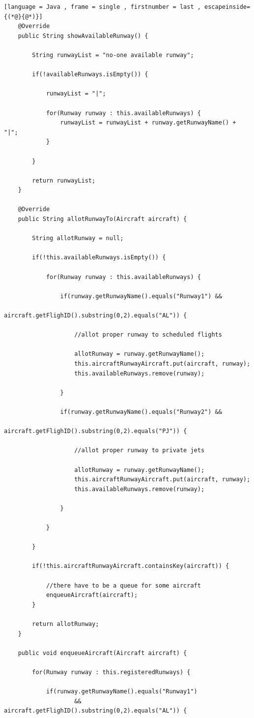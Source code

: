 \documentclass{article}
\begin{document}
\begin{sloppy}
\begin{lstlisting}[language = Java , frame = single , firstnumber = last , escapeinside={(*@}{@*)}]
	@Override
	public String showAvailableRunway() {
		
		String runwayList = "no-one available runway";
		
		if(!availableRunways.isEmpty()) {
			
			runwayList = "|";
			
			for(Runway runway : this.availableRunways) {
				runwayList = runwayList + runway.getRunwayName() + "|";
			}
			
		}
		
		return runwayList;
	}

	@Override
	public String allotRunwayTo(Aircraft aircraft) {
		
		String allotRunway = null;
		
		if(!this.availableRunways.isEmpty()) {
			
			for(Runway runway : this.availableRunways) {
				
				if(runway.getRunwayName().equals("Runway1") && 
						aircraft.getFlighID().substring(0,2).equals("AL")) {
					
					//allot proper runway to scheduled flights
					
					allotRunway = runway.getRunwayName();
					this.aircraftRunwayAircraft.put(aircraft, runway);
					this.availableRunways.remove(runway);
					
				}
				
				if(runway.getRunwayName().equals("Runway2") && 
						aircraft.getFlighID().substring(0,2).equals("PJ")) {
					
					//allot proper runway to private jets
					
					allotRunway = runway.getRunwayName();
					this.aircraftRunwayAircraft.put(aircraft, runway);
					this.availableRunways.remove(runway);
					
				}
				
			}
			
		}
		
		if(!this.aircraftRunwayAircraft.containsKey(aircraft)) {
			
			//there have to be a queue for some aircraft			
			enqueueAircraft(aircraft);
		}
		
		return allotRunway;
	}

	public void enqueueAircraft(Aircraft aircraft) {
		
		for(Runway runway : this.registeredRunways) {
			
			if(runway.getRunwayName().equals("Runway1") 
					&& aircraft.getFlighID().substring(0,2).equals("AL")) {
				

\end{lstlisting}
\end{sloppy}
\end{document}
